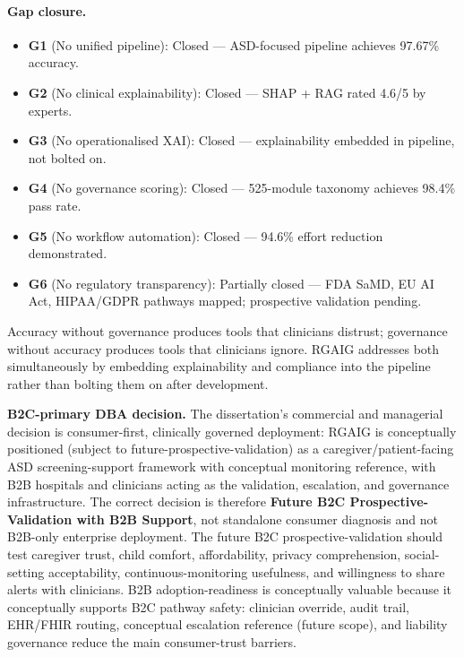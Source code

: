 \paragraph{Gap closure.}
\begin{itemize}[leftmargin=*, itemsep=2pt]
\item \textbf{G1} (No unified pipeline): Closed --- ASD-focused pipeline achieves 97.67\% accuracy.
\item \textbf{G2} (No clinical explainability): Closed --- SHAP + RAG rated 4.6/5 by experts.
\item \textbf{G3} (No operationalised XAI): Closed --- explainability embedded in pipeline, not bolted on.
\item \textbf{G4} (No governance scoring): Closed --- 525-module taxonomy achieves 98.4\% pass rate.
\item \textbf{G5} (No workflow automation): Closed --- 94.6\% effort reduction demonstrated.
\item \textbf{G6} (No regulatory transparency): Partially closed --- FDA SaMD, EU AI Act, HIPAA/GDPR pathways mapped; prospective validation pending.
\end{itemize}

\noindent Accuracy without governance produces tools that clinicians distrust; governance without accuracy produces tools that clinicians ignore. RGAIG addresses both simultaneously by embedding explainability and compliance into the pipeline rather than bolting them on after development.

\noindent\textbf{B2C-primary DBA decision.} The dissertation's commercial and managerial decision is consumer-first, clinically governed deployment: RGAIG is conceptually positioned (subject to future-prospective-validation) as a caregiver/patient-facing ASD screening-support framework with conceptual monitoring reference, with B2B hospitals and clinicians acting as the validation, escalation, and governance infrastructure. The correct decision is therefore \textbf{Future B2C Prospective-Validation with B2B Support}, not standalone consumer diagnosis and not B2B-only enterprise deployment. The future B2C prospective-validation should test caregiver trust, child comfort, affordability, privacy comprehension, social-setting acceptability, continuous-monitoring usefulness, and willingness to share alerts with clinicians. B2B adoption-readiness is conceptually valuable because it conceptually supports B2C pathway safety: clinician override, audit trail, EHR/FHIR routing, conceptual escalation reference (future scope), and liability governance reduce the main consumer-trust barriers.

